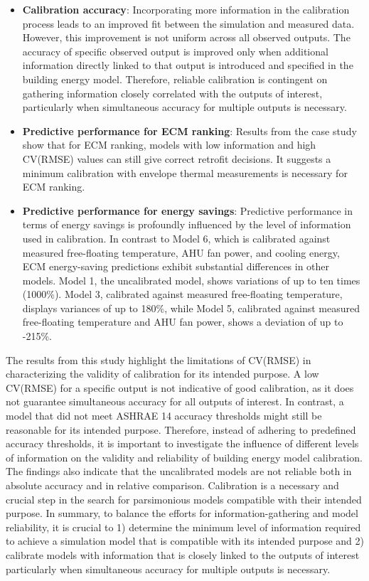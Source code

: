 \documentclass[3p,times,12pt]{elsarticle}
\begin{document}
\begin{sloppypar}
\begin{itemize}
\item \textbf{Calibration accuracy}: Incorporating more information in the calibration process leads to an improved fit between the simulation and measured data. However, this improvement is not uniform across all observed outputs. The accuracy of specific observed output is improved only when additional information directly linked to that output is introduced and specified in the building energy model. Therefore, reliable calibration is contingent on gathering information closely correlated with the outputs of interest, particularly when simultaneous accuracy for multiple outputs is necessary. 
\item \textbf{Predictive performance for ECM ranking}: Results from the case study show that for ECM ranking, models with low information and high CV(RMSE) values can still give correct retrofit decisions. It suggests a minimum calibration with envelope thermal measurements is necessary for ECM ranking.
\item \textbf{Predictive performance for energy savings}: Predictive performance in terms of energy savings is profoundly influenced by the level of information used in calibration. In contrast to Model 6, which is calibrated against measured free-floating temperature, AHU fan power, and cooling energy, ECM energy-saving predictions exhibit substantial differences in other models. Model 1, the uncalibrated model, shows variations of up to ten times (1000\%). Model 3, calibrated against measured free-floating temperature, displays variances of up to 180\%, while Model 5, calibrated against measured free-floating temperature and AHU fan power, shows a deviation of up to -215\%.
\end{itemize}

The results from this study highlight the limitations of CV(RMSE) in characterizing the validity of calibration for its intended purpose. A low CV(RMSE) for a specific output is not indicative of good calibration, as it does not guarantee simultaneous accuracy for all outputs of interest. In contrast, a model that did not meet ASHRAE 14 accuracy thresholds might still be reasonable for its intended purpose. Therefore, instead of adhering to predefined accuracy thresholds, it is important to investigate the influence of different levels of information on the validity and reliability of building energy model calibration. The findings also indicate that the uncalibrated models are not reliable both in absolute accuracy and in relative comparison. Calibration is a necessary and crucial step in the search for parsimonious models compatible with their intended purpose. In summary, to balance the efforts for information-gathering and model reliability, it is crucial to 1) determine the minimum level of information required to achieve a simulation model that is compatible with its intended purpose and 2) calibrate models with information that is closely linked to the outputs of interest particularly when simultaneous accuracy for multiple outputs is necessary.


\end{sloppypar}
\end{document}
